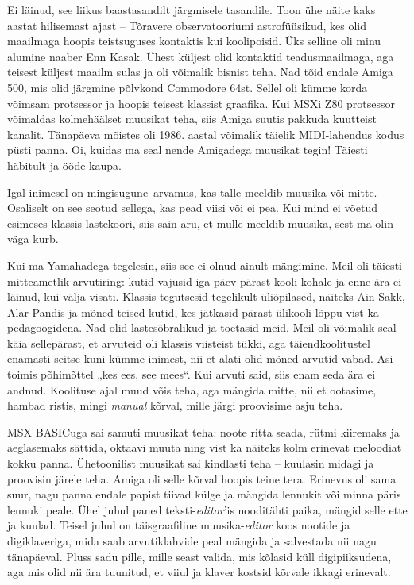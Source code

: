 Ei läinud, see liikus baastasandilt järgmisele tasandile. Toon ühe näite kaks aastat hilisemast ajast – Tõravere observatooriumi 
astrofüüsikud, kes olid maailmaga hoopis teistsuguses kontaktis kui 
koolipoisid. Üks selline oli minu alumine naaber Enn 
Kasak. Ühest küljest olid kontaktid 
teadusmaailmaga, aga teisest küljest maailm sulas ja oli 
võimalik bisnist teha. Nad tõid endale Amiga 
500, mis olid 
järgmine põlvkond Commodore 64st. Sellel oli kümme 
korda võimsam protsessor ja hoopis teisest klassist graafika. 
Kui MSXi Z80 protsessor võimaldas kolmehäälset muusikat teha, siis Amiga 
suutis pakkuda kuutteist kanalit. Tänapäeva mõistes oli 1986. aastal võimalik täielik MIDI-lahendus kodus püsti panna. Oi, kuidas 
ma seal nende Amigadega muusikat tegin! Täiesti häbitult ja ööde kaupa.


Igal inimesel on mingisugune arvamus, kas talle meeldib muusika või mitte. Osaliselt on see seotud sellega, 
kas pead viisi või ei pea. Kui mind ei võetud esimeses klassis lastekoori, siis sain aru, et mulle meeldib muusika, sest ma olin väga kurb. 

Kui ma Yamahadega tegelesin, siis see ei olnud ainult mängimine. 
Meil oli täiesti mitteametlik arvutiring: 
kutid vajusid iga päev pärast kooli kohale ja enne ära ei läinud, kui välja 
visati. Klassis tegutsesid tegelikult 
üliõpilased, näiteks Ain Sakk, Alar Pandis ja mõned teised kutid, kes jätkasid pärast ülikooli lõppu vist ka pedagoogidena. Nad olid lastesõbralikud ja toetasid meid. Meil oli võimalik seal käia sellepärast, et
arvuteid oli klassis viisteist tükki, aga 
täiendkoolitustel enamasti seitse kuni kümme inimest, nii et 
alati olid mõned arvutid vabad. Asi toimis põhimõttel „kes ees, see mees“. Kui arvuti said, siis enam seda ära ei 
andnud. Koolituse ajal muud võis teha, aga mängida mitte, nii et ootasime, hambad ristis, mingi \emph{manual} 
kõrval, mille järgi proovisime asju teha. 

MSX BASICuga sai samuti muusikat teha: noote ritta seada, 
rütmi kiiremaks ja aeglasemaks sättida, oktaavi muuta ning vist ka näiteks 
kolm erinevat meloodiat kokku panna. Ühetoonilist muusikat sai 
kindlasti teha – kuulasin midagi ja proovisin 
järele teha. Amiga oli selle kõrval hoopis teine tera.
Erinevus oli sama suur, nagu panna endale papist 
tiivad külge ja mängida lennukit või minna päris lennuki peale. 
Ühel juhul paned teksti-\emph{editor}'is nooditähti paika, mängid selle ette ja kuulad. Teisel juhul on täisgraafiline muusika-\emph{editor} koos nootide ja digiklaveriga, mida saab arvutiklahvide peal mängida ja salvestada nii nagu tänapäeval. Pluss sadu pille, mille seast valida, mis 
kõlasid küll digipiiksudena, aga mis olid nii ära tuunitud, et viiul ja klaver kostsid kõrvale ikkagi erinevalt.


